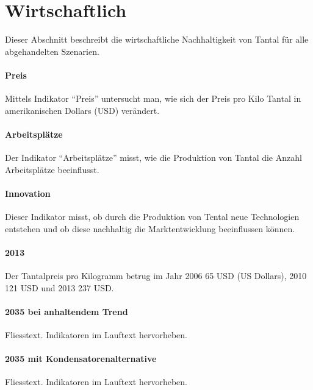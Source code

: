 
\section{Wirtschaftlich}\label{sec:conflict}

Dieser Abschnitt beschreibt die wirtschaftliche Nachhaltigkeit von Tantal für alle abgehandelten Szenarien.

\paragraph{Preis}
Mittels Indikator ``Preis'' untersucht man, wie sich der Preis pro Kilo Tantal
in amerikanischen Dollars (USD) verändert.

\paragraph{Arbeitsplätze}
Der Indikator ``Arbeitsplätze'' misst, wie die Produktion von Tantal die Anzahl
Arbeitsplätze beeinflusst.

\paragraph{Innovation}
Dieser Indikator misst, ob durch die Produktion von Tental neue Technologien
entstehen und ob diese nachhaltig die Marktentwicklung beeinflussen können.

\paragraph{2013}
Der Tantalpreis pro Kilogramm betrug im Jahr 2006 65 USD (US Dollars), 2010 121 USD und 2013 237 USD.


\paragraph{2035 bei anhaltendem Trend}
Fliesstext. Indikatoren im Lauftext hervorheben.

\paragraph{2035 mit Kondensatorenalternative}
Fliesstext. Indikatoren im Lauftext hervorheben.


